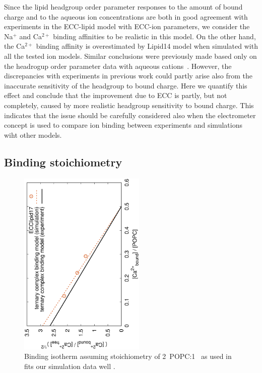 \documentclass[aip,jcp,twocolumn]{revtex4}
\begin{document}
Since the lipid headgroup order parameter responses to the amount of bound charge
and to the aqueous ion concentrations are both in good agreement with experiments
in the ECC-lipid model with ECC-ion parameters, we consider the Na$^+$ and Ca$^{2+}$
binding affinities to be realistic in this model. On the other hand, the Ca$^{2+}$
binding affinity is overestimated by Lipid14 model when simulated with all the
tested ion models. Similar conclusions were previously made based only on the headrogup
order parameter data with aqueous cations~\cite{catte16}. However,
the discrepancies with experiments in previous work could partly arise also from
the inaccurate sensitivity of the headgroup to bound charge. Here we quantify this
effect and conclude that the improvement due to ECC is partly, but not completely,
caused by more realistic headgroup sensitivity to bound charge.
This indicates that the issue should be carefully considered also when
the electrometer concept is used to compare ion binding between experiments
and simulations wiht other models.





\subsection{Binding stoichiometry}

\begin{figure}[]
  \centering
  \includegraphics[height=9.0cm,angle=-90]{../Fig/bound-CAs_conc-eccl17.eps}
  \caption{\label{fig:cacl-bind}
    Binding isotherm assuming stoichiometry of 2~POPC:1~ as used in \cite{altenbach84} fits our simulation data well .
    }
\end{figure}
\end{document}
